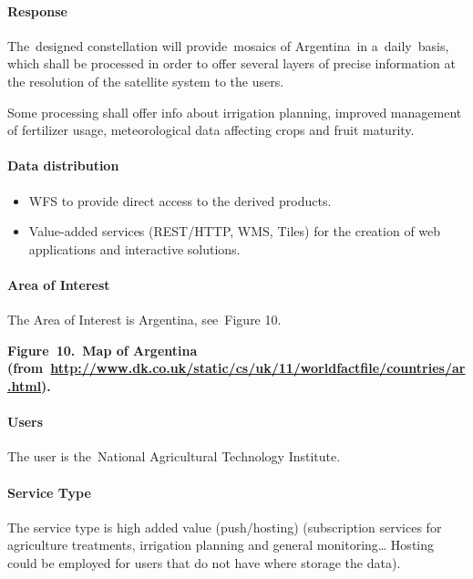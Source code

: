 \documentclass[a4paper]{article}
\newcommand\liststyleLFOxv{%
\renewcommand\labelitemi{[F0B7?]}
\renewcommand\labelitemii{o}
\renewcommand\labelitemiii{[F0A7?]}
\renewcommand\labelitemiv{[F0B7?]}
}
\begin{document}
\paragraph[Response]{ Response}
The\ designed constellation will provide\ mosaics of Argentina\ in
a\ daily\ basis, which shall be processed in order to offer several
layers of precise information at the resolution of the satellite system
to the users.

Some processing shall offer info about irrigation planning, improved
management of fertilizer usage, meteorological data affecting crops and
fruit maturity.

\paragraph[Data distribution]{ Data
distribution}
\liststyleLFOxv
\begin{itemize}
\item WFS to provide direct access to the derived products.
\item Value-added services (REST/HTTP, WMS, Tiles) for the creation of
web applications and interactive solutions.\ 
\end{itemize}
\paragraph[Area of Interest\ ]{ Area of
Interest\ }
\foreignlanguage{english}{The Area of Interest is Argentina,
see\ }Figure 10\foreignlanguage{english}{.}


\bigskip

{%
 \par}

{\centering\bfseries
\label{bkm:Ref377562868}Figure\ 10.\ Map of Argentina
(from\ \url{http://www.dk.co.uk/static/cs/uk/11/worldfactfile/countries/ar.html}).
\par}


\bigskip

\paragraph[Users]{ Users}
{\selectlanguage{english}
The user is the\ National Agricultural Technology Institute.}

\paragraph[Service Type]{ Service Type}
\foreignlanguage{english}{The service type is high added value
(push/hosting) (subscription services for agriculture treatments,
irrigation planning and general monitoring{\dots} Hosting could be
employed for users that do not have where storage the
data)}\foreignlanguage{english}{.}
\end{document}

